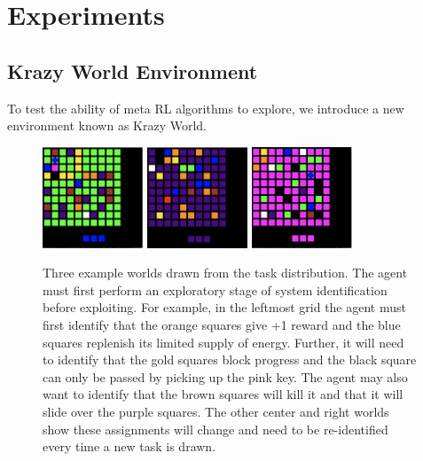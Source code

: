 \documentclass{article} %
\begin{document}
\section{Experiments}

\subsection{Krazy World Environment} 

To test the ability of meta RL algorithms to explore, we introduce a new environment known as Krazy World. 

\begin{figure}[H]
\begin{center}
\includegraphics[width=30mm]{envs/grid_0.png}\hfill
\includegraphics[width=30mm]{envs/grid_1.png}\hfill
\includegraphics[width=30mm ]{envs/grid_2.png} 
\end{center}
\caption{Three example worlds drawn from the task distribution. The agent must first perform an exploratory stage of system identification before exploiting. For example, in the leftmost grid the agent must first identify that the orange squares give +1 reward and the blue squares replenish its limited supply of energy. Further, it will need to identify that the gold squares block progress and the black square can only be passed by picking up the pink key. The agent may also want to identify that the brown squares will kill it and that it will slide over the purple squares. The other center and right worlds show these assignments will change and need to be re-identified every time a new task is drawn.} %
\end{figure} 
\end{document}
